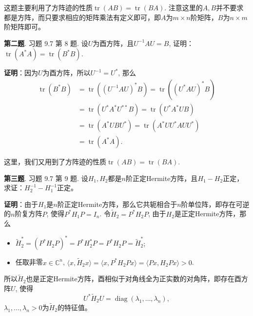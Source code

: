 \vspace{1em}

这题主要利用了方阵迹的性质$\operatorname{tr}(AB) = \operatorname{tr}(BA)$. 注意这里的$A, B$并不要求都是方阵，而只要求相应的矩阵乘法有定义即可，即$A$为$m\times n$阶矩阵，$B$为$n\times m$阶矩阵即可。


\newpageorvspace


{\bf 第二题}. 习题 9.7 第 8 题. 设$U$为酉方阵，且$U^{-1}AU = B$, 证明：$\operatorname{tr} \left( A^* A \right) = \operatorname{tr} \left( B^* B \right).$

\newpageorvspace

{\bf 证明}：因为$U$为酉方阵，所以$U^{-1} = U^*$, 那么
\begin{align*}
\operatorname{tr} \left( B^* B \right) & = \operatorname{tr} \left( \left( U^{-1} A U \right)^* B \right) = \operatorname{tr} \left( \left( U^* A U \right)^* B \right) \\
& = \operatorname{tr} \left( U^* A^* U^{**} B \right) = \operatorname{tr} \left( U^* A^* U B \right) \\
& = \operatorname{tr} \left( A^* U B U^* \right) = \operatorname{tr} \left( A^* U U^* A U U^* \right) \\
& = \operatorname{tr} \left( A^* A \right).
\end{align*}

这里，我们又用到了方阵迹的性质$\operatorname{tr}(AB) = \operatorname{tr}(BA)$.


\newpageorvspace


{\bf 第三题}. 习题 9.7 第 9 题. 设$H_1, H_2$都是$n$阶正定Hermite方阵，且$H_1 - H_2$正定，求证：$H_2^{-1} - H_1^{-1}$正定。

\newpageorvspace

{\bf 证明}：由于$H_1$是$n$阶正定Hermite方阵，那么它共轭相合于$n$阶单位阵，即存在可逆的$n$阶复方阵$P$, 使得$P^* H_1 P = I_n$. 令$\widetilde{H}_2 = P^* H_2 P$, 由于$H_2$是正定Hermite方阵，那么
\begin{itemize}
\item $\widetilde{H}_2^* = \left( P^* H_2 P \right)^* = P^* H_2^* P = P^* H_2 P = \widetilde{H}_2^*$;
\item 任取非零$x \in \mathbb{C}^n$, $\langle x, \widetilde{H}_2 x \rangle = \langle x, P^* H_2 P x \rangle = \langle Px, H_2 P x \rangle > 0$.
\end{itemize}
所以$\widetilde{H}_2$也是正定Hermite方阵，酉相似于对角线全为正实数的对角阵，即存在酉方阵$U$, 使得
$$U^* \widetilde{H}_2 U = \operatorname{diag} (\lambda_1, \ldots, \lambda_n),$$
$\lambda_1, \ldots, \lambda_n > 0$为$\widetilde{H}_2$的特征值。

